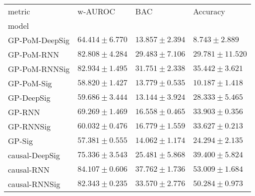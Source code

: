 \begin{tabular}{llll}
\toprule
metric &                                        w-AUROC &                                            BAC &                                       Accuracy \\
model          &                                                &                                                &                                                \\
\midrule
GP-PoM-DeepSig &                           $ 64.414 \pm 6.770 $ &                           $ 13.857 \pm 2.394 $ &                            $ 8.743 \pm 2.889 $ \\
GP-PoM-RNN     &                           $ 82.808 \pm 4.284 $ &                           $ 29.483 \pm 7.106 $ &                          $ 29.781 \pm 11.520 $ \\
GP-PoM-RNNSig  &                           $ 82.934 \pm 1.495 $ &                           $ 31.751 \pm 2.338 $ &                           $ 35.442 \pm 3.621 $ \\
GP-PoM-Sig     &                           $ 58.820 \pm 1.427 $ &                           $ 13.779 \pm 0.535 $ &                           $ 10.187 \pm 1.418 $ \\
GP-DeepSig     &                           $ 59.686 \pm 3.444 $ &                           $ 13.144 \pm 3.924 $ &                           $ 28.333 \pm 5.465 $ \\
GP-RNN         &                           $ 69.269 \pm 1.469 $ &                           $ 16.558 \pm 0.465 $ &                           $ 33.903 \pm 0.356 $ \\
GP-RNNSig      &                           $ 60.032 \pm 0.476 $ &                           $ 16.779 \pm 1.559 $ &                           $ 33.627 \pm 0.213 $ \\
GP-Sig         &                           $ 57.381 \pm 0.555 $ &                           $ 14.062 \pm 1.174 $ &                           $ 24.294 \pm 2.135 $ \\
causal-DeepSig &                           $ 75.336 \pm 3.543 $ &                           $ 25.481 \pm 5.868 $ &                           $ 39.400 \pm 5.824 $ \\
causal-RNN     &                           $ 84.107 \pm 0.606 $ &                           $ 37.762 \pm 1.736 $ &                           $ 53.009 \pm 1.684 $ \\
causal-RNNSig  &                           $ 82.343 \pm 0.235 $ &                           $ 33.570 \pm 2.776 $ &                           $ 50.284 \pm 0.973 $ \\

\end{tabular}
